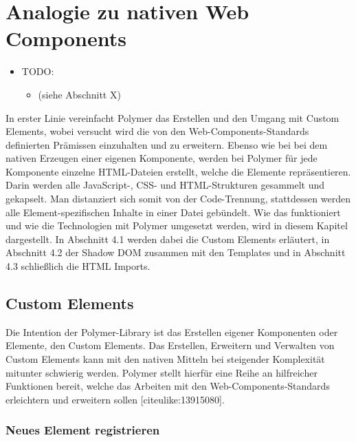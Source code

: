 \documentclass[]{article}
\date{}
\providecommand{\tightlist}{%
  \setlength{\itemsep}{0pt}\setlength{\parskip}{0pt}}
\begin{document}
\section{Analogie zu nativen Web
Components}\label{analogie-zu-nativen-web-components}

\begin{itemize}
\tightlist
\item
  TODO:

  \begin{itemize}
  \tightlist
  \item
    (siehe Abschnitt X)
  \end{itemize}
\end{itemize}

In erster Linie vereinfacht Polymer das Erstellen und den Umgang mit
Custom Elements, wobei versucht wird die von den
Web-Components-Standards definierten Prämissen einzuhalten und zu
erweitern. Ebenso wie bei bei dem nativen Erzeugen einer eigenen
Komponente, werden bei Polymer für jede Komponente einzelne HTML-Dateien
erstellt, welche die Elemente repräsentieren. Darin werden alle
JavaScript-, CSS- und HTML-Strukturen gesammelt und gekapselt. Man
distanziert sich somit von der Code-Trennung, stattdessen werden alle
Element-spezifischen Inhalte in einer Datei gebündelt. Wie das
funktioniert und wie die Technologien mit Polymer umgesetzt werden, wird
in diesem Kapitel dargestellt. In Abschnitt 4.1 werden dabei die Custom
Elements erläutert, in Abschnitt 4.2 der Shadow DOM zusammen mit den
Templates und in Abschnitt 4.3 schließlich die HTML Imports.

\subsection{Custom Elements}\label{custom-elements}

Die Intention der Polymer-Library ist das Erstellen eigener Komponenten
oder Elemente, den Custom Elements. Das Erstellen, Erweitern und
Verwalten von Custom Elements kann mit den nativen Mitteln bei
steigender Komplexität mitunter schwierig werden. Polymer stellt hierfür
eine Reihe an hilfreicher Funktionen bereit, welche das Arbeiten mit den
Web-Components-Standards erleichtern und erweitern sollen
{[}citeulike:13915080{]}.

\subsubsection{Neues Element
registrieren}\label{neues-element-registrieren}
\end{document}
